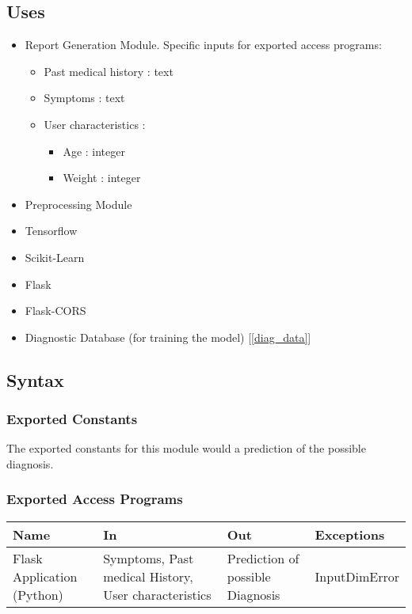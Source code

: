 \documentclass[12pt, titlepage]{article}
\begin{document}
\subsection{Uses}
\begin{itemize}
  \item Report Generation Module. Specific inputs for exported access programs:
    \begin{itemize}
      \item Past medical history : text
      \item Symptoms : text
      \item User characteristics :
        \begin{itemize}
          \item Age : integer
          \item Weight : integer
        \end{itemize}
    \end{itemize}
  \item Preprocessing Module
  \item Tensorflow
  \item Scikit-Learn
  \item Flask
  \item Flask-CORS
  \item Diagnostic Database (for training the model) [\ref{diag_data}]
\end{itemize}

\subsection{Syntax}

\subsubsection{Exported Constants}
The exported constants for this module would a prediction of the possible diagnosis.

\subsubsection{Exported Access Programs}

\begin{center}
\begin{tabular}{p{2cm} p{4cm} p{4cm} p{2cm}}
\hline
\textbf{Name} & \textbf{In} & \textbf{Out} & \textbf{Exceptions} \\
\hline
Flask Application (Python) & Symptoms, Past medical History, User characteristics & Prediction of possible Diagnosis & InputDimError \\
\hline
\end{tabular}
\end{center}
\end{document}
